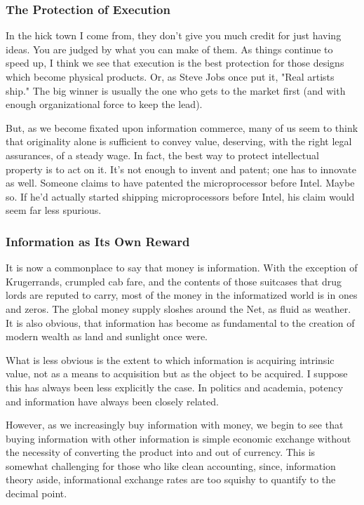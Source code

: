 \documentclass[
]{article}
\begin{document}
\hypertarget{header-n321}{%
\subsubsection{The Protection of Execution}\label{header-n321}}

In the hick town I come from, they don't give you much credit for just
having ideas. You are judged by what you can make of them. As things
continue to speed up, I think we see that execution is the best
protection for those designs which become physical products. Or, as
Steve Jobs once put it, "Real artists ship." The big winner is usually
the one who gets to the market first (and with enough organizational
force to keep the lead).

But, as we become fixated upon information commerce, many of us seem to
think that originality alone is sufficient to convey value, deserving,
with the right legal assurances, of a steady wage. In fact, the best way
to protect intellectual property is to act on it. It's not enough to
invent and patent; one has to innovate as well. Someone claims to have
patented the microprocessor before Intel. Maybe so. If he'd actually
started shipping microprocessors before Intel, his claim would seem far
less spurious.

\hypertarget{header-n324}{%
\subsubsection{Information as Its Own Reward}\label{header-n324}}

It is now a commonplace to say that money is information. With the
exception of Krugerrands, crumpled cab fare, and the contents of those
suitcases that drug lords are reputed to carry, most of the money in the
informatized world is in ones and zeros. The global money supply sloshes
around the Net, as fluid as weather. It is also obvious, that
information has become as fundamental to the creation of modern wealth
as land and sunlight once were.

What is less obvious is the extent to which information is acquiring
intrinsic value, not as a means to acquisition but as the object to be
acquired. I suppose this has always been less explicitly the case. In
politics and academia, potency and information have always been closely
related.

However, as we increasingly buy information with money, we begin to see
that buying information with other information is simple economic
exchange without the necessity of converting the product into and out of
currency. This is somewhat challenging for those who like clean
accounting, since, information theory aside, informational exchange
rates are too squishy to quantify to the decimal point.
\end{document}
